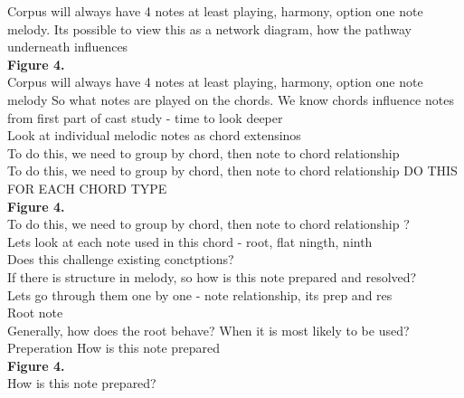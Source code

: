 \documentclass[11pt]{article}
\begin{document}
\noindent
Corpus will always have 4 notes at least playing, harmony, option one note melody. Its possible to view this as a network diagram, how the pathway underneath influences
\\

\noindent
\textbf{Figure 4.}
\\\vspace{5mm} 
\noindent
Corpus will always have 4 notes at least playing, harmony, option one note melody
So what notes are played on the chords. We know chords influence notes from first part of cast study - time to look deeper
\\

\noindent
Look at individual melodic notes as chord extensinos
\\

\noindent
To do this, we need to group by chord, then note to chord relationship
\\

\noindent
To do this, we need to group by chord, then note to chord relationship
DO THIS FOR EACH CHORD TYPE 
\\

\noindent
\textbf{Figure 4.}
\\\vspace{5mm} 
\noindent
To do this, we need to group by chord, then note to chord relationship ?
\\


\noindent
Lets look at each note used in this chord - root, flat ningth, ninth
\\

\noindent
Does this challenge existing conctptions?
\\

\noindent
If there is structure in melody, so how is this note prepared and resolved?
\\

\noindent
Lets go through them one by one - note relationship, its prep and res
\\

\noindent
Root note
\\

\noindent
Generally, how does the root behave? When it is most likely to be used?
\\

\noindent
Preperation How is this note prepared
\\



\noindent
\textbf{Figure 4.}
\\\vspace{5mm} 
\noindent
How is this note prepared?
\\
\end{document}
